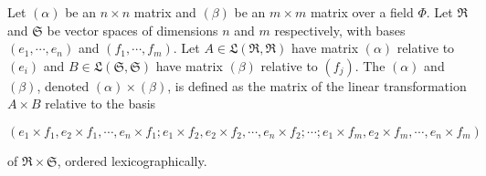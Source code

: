 Let $(\alpha)$ be an $n \times n$ matrix and $(\beta)$ be an $m \times m$ matrix over a field $\Phi$. Let $\Re$ and $\mathfrak{S}$ be vector spaces of dimensions $n$ and $m$ respectively, with bases $(e_1, \cdots, e_n)$ and $(f_1, \cdots, f_m)$. Let $A \in \mathfrak{L}(\Re, \Re)$ have matrix $(\alpha)$ relative to $(e_i)$ and $B \in \mathfrak{L}(\mathfrak{S}, \mathfrak{S})$ have matrix $(\beta)$ relative to $(f_j)$. The  $(\alpha)$ and $(\beta)$, denoted $(\alpha) \times (\beta)$, is defined as the matrix of the linear transformation $A \times B$ relative to the basis

$$(e_1 \times f_1, e_2 \times f_1, \cdots, e_n \times f_1; e_1 \times f_2, e_2 \times f_2, \cdots, e_n \times f_2; \cdots; e_1 \times f_m, e_2 \times f_m, \cdots, e_n \times f_m)$$

of $\Re \times \mathfrak{S}$, ordered lexicographically.
